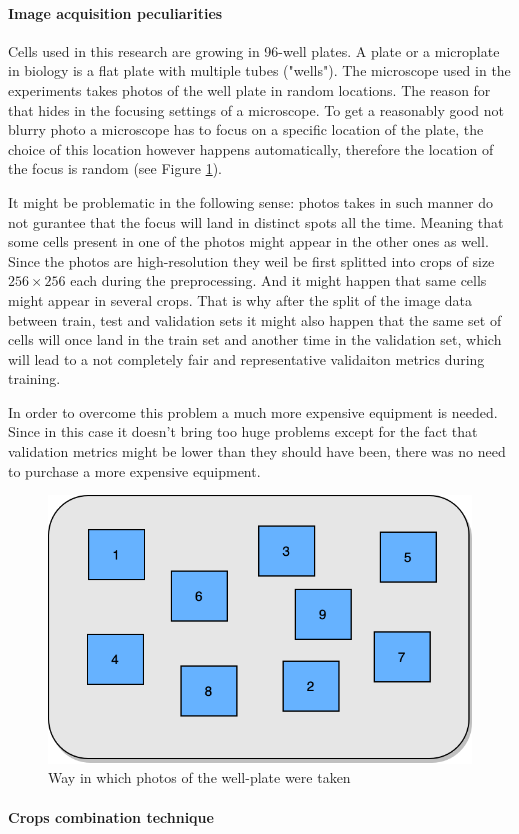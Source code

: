 \paragraph{Image acquisition peculiarities} 
    Cells used in this research are growing in 96-well plates. A plate or a microplate in biology is a flat plate with multiple tubes ("wells"). The microscope used in the experiments takes photos of the well plate in random locations. The reason for that hides in the focusing settings of a  microscope. To get a reasonably good not blurry photo a microscope has to focus on a specific location of the plate, the choice of this location however happens automatically, therefore the location of the focus is random (see Figure \ref{fig:random-dic}). 
    
    It might be problematic in the following sense: photos takes in such manner do not gurantee that the focus will land in distinct spots all the time. Meaning that some cells present in one of the photos might appear in the other ones as well. Since the photos are high-resolution they weil be first splitted into crops of size $256 \times 256$ each during the preprocessing. And it might happen that same cells might appear in several crops. That is why after the split of the image data between train, test and validation sets it might also happen that the same set of cells will once land in the train set and another time in the validation set, which will lead to a not completely fair and representative validaiton metrics during training.
    
    In order to overcome this problem a much more expensive equipment is needed. Since in this case it doesn't bring too huge problems except for the fact that validation metrics might be lower than they should have been, there was no need to purchase a more expensive equipment.   
    
    \begin{figure}[htb]
        \begin{center}
            \includegraphics[width=0.3\linewidth]{bilder/dic-random.png}
            \caption{Way in which photos of the well-plate were taken}\label{fig:random-dic}
        \end{center}
    \end{figure}    
\paragraph{Crops combination technique}\label{par:crops-combination}
    